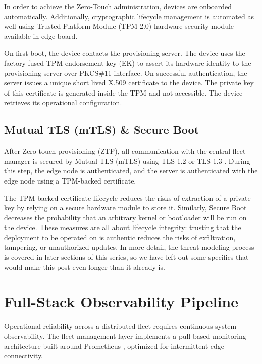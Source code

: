 \documentclass[conference]{IEEEtran}
\begin{document}
In order to achieve the Zero-Touch administration, devices are onboarded automatically. Additionally, cryptographic lifecycle management is automated as well using Trusted Platform Module (TPM 2.0) \cite{b19} hardware security module available in edge board.

On first boot, the device contacts the provisioning server. The device uses the factory fused TPM endorsement key (EK) to assert its hardware identity to the provisioning server over PKCS\#11 interface. On successful authentication, the server issues a unique short lived X.509 certificate to the device. The private key of this certificate is generated inside the TPM and not accessible. The device retrieves its operational configuration.

\subsection{Mutual TLS (mTLS) \& Secure Boot}
After Zero-touch provisioning (ZTP), all communication with the central fleet manager is secured by Mutual TLS (mTLS) using TLS 1.2 \cite{b23} or TLS 1.3 \cite{b29}. During this step, the edge node is authenticated, and the server is authenticated with the edge node using a TPM-backed certificate.

The TPM-backed certificate lifecycle reduces the risks of extraction of a private key by relying on a secure hardware module to store it. Similarly, Secure Boot decreases the probability that an arbitrary kernel or bootloader will be run on the device. These measures are all about lifecycle integrity: trusting that the deployment to be operated on is authentic reduces the risks of exfiltration, tampering, or unauthorized updates. In more detail, the threat modeling process is covered in later sections of this series, so we have left out some specifics that would make this post even longer than it already is.

\section{Full-Stack Observability Pipeline}

Operational reliability across a distributed fleet requires continuous system observability. The fleet-management layer implements a pull-based monitoring architecture built around Prometheus \cite{b22}, optimized for intermittent edge connectivity.
\end{document}
